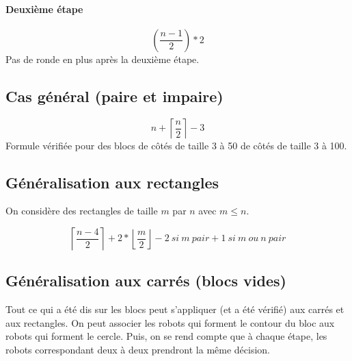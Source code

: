 \documentclass[11pt, a4paper]{article}
\begin{document}
\paragraph{Deuxième étape}
\[ ( \frac{n-1}{2} ) *2 \]
Pas de ronde en plus après la deuxième étape.

\subsection{Cas général (paire et impaire)}
\[ n + \left\lceil \frac{n}{2} \right\rceil -3 \]
Formule vérifiée pour des blocs de côtés de taille 3 à 50 de côtés de taille 3
à 100.

\subsection{Généralisation aux rectangles}

On considère des rectangles de taille $m$ par $n$ avec $m \leq n$.

\[
    \left\lceil \frac{n-4}{2} \right\rceil
  + 2*\left\lfloor \frac{m}{2} \right\rfloor
  -2\ si\ m\ pair
  +1\ si\ m\ ou\ n\ pair
\]

\subsection{Généralisation aux carrés (blocs vides)}

Tout ce qui a été dis sur les blocs peut s'appliquer (et a été vérifié) aux
carrés et aux rectangles. On peut associer les robots qui forment le contour du
bloc aux robots qui forment le cercle. Puis, on se rend compte que à chaque
étape, les robots correspondant deux à deux prendront la même décision.
\end{document}

